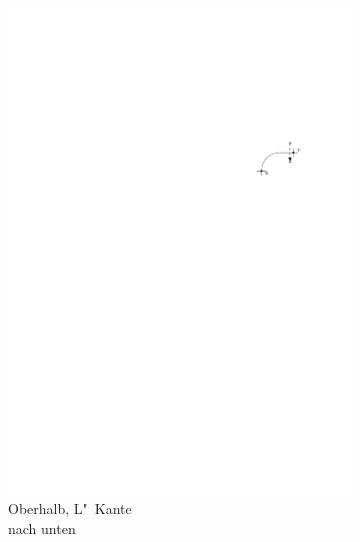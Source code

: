 \documentclass[a4paper]{scrreprt}
\theoremstyle{definition}
\begin{document}
\begin{figure}[h]
\begin{subfigure}[b]{0.2\textwidth}
                \includegraphics[width=\textwidth]{schnitt_finden/top_downwardsL}
                \caption{Oberhalb, L"~Kante \\ nach unten}
                \label{fig:cutfinding_top_downwardsL}
        \end{subfigure}
        \quad
        \begin{subfigure}[b]{0.2\textwidth}

\end{subfigure}
\end{figure}
\end{document}
